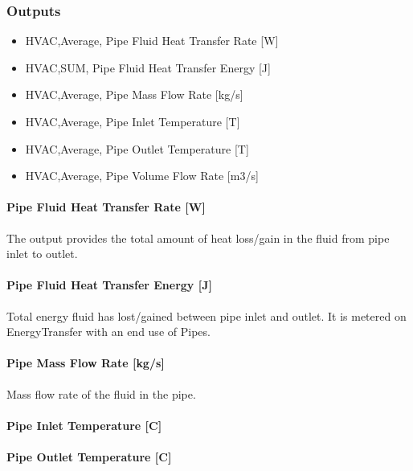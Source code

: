 \subsubsection{Outputs}\label{outputs-7-005}

\begin{itemize}
\item
  HVAC,Average, Pipe Fluid Heat Transfer Rate {[}W{]}
\item
  HVAC,SUM, Pipe Fluid Heat Transfer Energy {[}J{]}
\item
  HVAC,Average, Pipe Mass Flow Rate {[}kg/s{]}
\item
  HVAC,Average, Pipe Inlet Temperature {[}T{]}
\item
  HVAC,Average, Pipe Outlet Temperature {[}T{]}
\item
  HVAC,Average, Pipe Volume Flow Rate {[}m3/s{]}
\end{itemize}

\paragraph{Pipe Fluid Heat Transfer Rate {[}W{]}}\label{pipe-fluid-heat-transfer-rate-w-1}

The output provides the total amount of heat loss/gain in the fluid from pipe inlet to outlet.

\paragraph{Pipe Fluid Heat Transfer Energy {[}J{]}}\label{pipe-fluid-heat-transfer-energy-j-1}

Total energy fluid has lost/gained between pipe inlet and outlet. It is metered on EnergyTransfer with an end use of Pipes.

\paragraph{Pipe Mass Flow Rate {[}kg/s{]}}\label{pipe-mass-flow-rate-kgs-1}

Mass flow rate of the fluid in the pipe.

\paragraph{Pipe Inlet Temperature {[}C{]}}\label{pipe-inlet-temperature-c-1}

\paragraph{Pipe Outlet Temperature {[}C{]}}\label{pipe-outlet-temperature-c-1}

